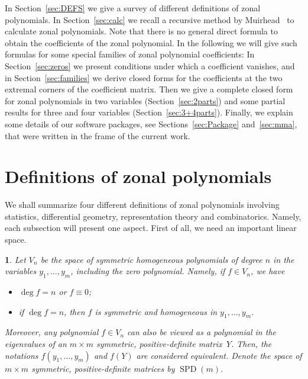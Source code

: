 \documentclass[smallextended]{svjour3}
\newtheorem{defn}[thm]{\protect\definitionname}
\newcommand{\SPD}{\operatorname{SPD}}
\providecommand{\definitionname}{Definition}
\begin{document}
In Section~\ref{sec:DEFS} we give a survey
of different definitions of zonal polynomials. In Section~\ref{sec:calc} we
recall a recursive method by Muirhead~\cite{Muirhead} to calculate zonal
polynomials. Note that there is no general direct formula to obtain the
coefficients of the zonal polynomial.  In the following we will give such
formulas for some special families of zonal polynomial coefficients: In
Section~\ref{sec:zeros} we present conditions under which a
coefficient vanishes, and in Section~\ref{sec:families} we derive closed
forms for the coefficients at the two extremal corners of the coefficient
matrix. Then we give a complete closed form for zonal polynomials in two
variables (Section~\ref{sec:2parts}) and some partial results for three and
four variables (Section~\ref{sec:3+4parts}). Finally, we explain some details
of our software packages, see Sections~\ref{sec:Package} and~\ref{sec:mma},
that were written in the frame of the current work.

\section{\label{sec:DEFS}Definitions of zonal polynomials}

We shall summarize four different definitions of zonal polynomials
involving statistics, differential geometry, representation theory
and combinatorics. Namely, each subsection will present one aspect. 
First of all, we need an important linear space.
\begin{defn}
Let $V_{n}$ be the space of symmetric homogeneous polynomials of
degree $n$ in the variables $y_{1},\ldots,y_{m}$, including the zero polynomial.
Namely, if $f\in V_{n}$, we have 
\begin{itemize}
\item $\deg f=n$ or $f\equiv0$;
\item if $\deg f=n$, then $f$ is symmetric and homogeneous in $y_{1},\ldots,y_{m}$.
\end{itemize}
Moreover, any polynomial $f\in V_{n}$ can also be viewed as a polynomial
in the eigenvalues of an $m\times m$ symmetric, positive-definite matrix~$Y$.
Then, the notations $f(y_1,\dots,y_m)$ and $f(Y)$ are considered equivalent.
Denote the space of $m\times m$ symmetric, positive-definite matrices
by $\SPD(m)$. 
\end{defn}
\end{document}
